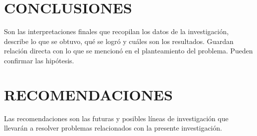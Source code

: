 \newpage
\section{CONCLUSIONES}

Son las interpretaciones finales que recopilan los datos de la investigación, describe lo que se obtuvo, qué se logró y cuáles son los resultados. Guardan relación directa con lo que se mencionó en el planteamiento del problema. Pueden confirmar las hipótesis. 


\newpage
\section{RECOMENDACIONES}

Las recomendaciones son las futuras y posibles líneas de investigación que llevarán a resolver problemas relacionados con la presente investigación.


